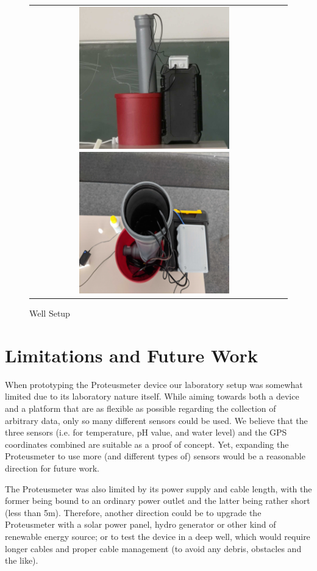 \documentclass[11pt, letterpaper]{article}
\begin{document}
\begin{figure}[h!]
	\centering
	\begin{tabular}{cc}
		\includegraphics[width=65mm]{figures/well_simulation1.jpg}
		\includegraphics[width=65mm]{figures/well_simulation2.jpg} \\
	\end{tabular}
	\caption{Well Setup}
	\label{fig:well_setup}
\end{figure}
\newpage

\section{Limitations and Future Work}
When prototyping the Proteusmeter device our laboratory setup was somewhat limited due to its laboratory nature itself. While aiming towards both a device and a platform that are as flexible as possible regarding the collection of arbitrary data, only so many different sensors could be used. We believe that the three sensors (i.e. for temperature, pH value, and water level) and the GPS coordinates combined are suitable as a proof of concept. Yet, expanding the Proteusmeter to use more (and different types of) sensors would be a reasonable direction for future work.
\newline

The Proteusmeter was also limited by its power supply and cable length, with the former being bound to an ordinary power outlet and the latter being rather short (less than 5m). Therefore, another direction could be to upgrade the Proteusmeter with a solar power panel, hydro generator or other kind of renewable energy source; or to test the device in a deep well, which would require longer cables and proper cable management (to avoid any debris, obstacles and the like).
\newline
\end{document}
